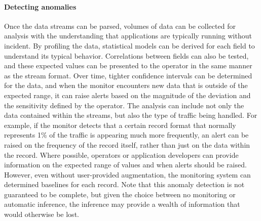 \paragraph*{Detecting anomalies} Once the data streams can be parsed,
volumes of data can be collected for analysis with the understanding
that applications are typically running without incident. By profiling
the data, statistical models can be derived for each field to
understand its typical behavior. Correlations between fields can also
be tested, and these expected values can be presented to the operator
in the same manner as the stream format. Over time,
tighter confidence intervals can be determined for the data, and when
the monitor encounters new data that is outside of the expected range,
it can raise alerts based on the magnitude of the deviation and the
sensitivity defined by the operator. The analysis can include not only 
the data contained within the streams, but also the type of traffic
being handled. For example, if the monitor detects that a certain
record format that normally represents 1\% of the traffic is appearing
much more frequently, an alert can be raised on the frequency of the
record itself, rather than just on the data within the record. Where
possible, operators or application developers can provide
information on the expected range of values and when alerts should be
raised.  However, even without user-provided augmentation, the
monitoring system can determined baselines for each
record. Note that this anomaly 
detection is not guaranteed to be complete, but given the choice
between no monitoring or automatic inference, the inference may
provide a wealth of information that would otherwise be lost.

